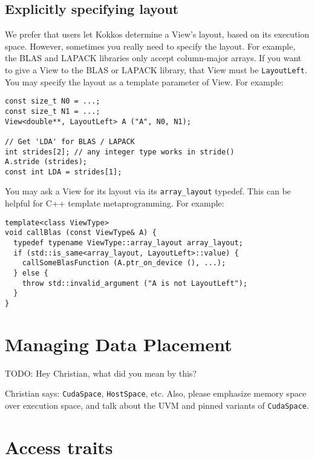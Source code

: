 \subsection{Explicitly specifying layout}\label{SS:View:Layout:Explicit}

We prefer that users let Kokkos determine a View's layout, based on
its execution space.  However, sometimes you really need to specify
the layout.  For example, the BLAS and LAPACK libraries only accept
column-major arrays.  If you want to give a View to the BLAS or
LAPACK library, that View must be \lstinline!LayoutLeft!.  You may specify the
layout as a template parameter of View.  For example:
\begin{lstlisting}
const size_t N0 = ...;
const size_t N1 = ...;
View<double**, LayoutLeft> A ("A", N0, N1);

// Get 'LDA' for BLAS / LAPACK
int strides[2]; // any integer type works in stride()
A.stride (strides);
const int LDA = strides[1];
\end{lstlisting}
You may ask a View for its layout via its \lstinline!array_layout! typedef.
This can be helpful for C++ template metaprogramming.  For example:
\begin{lstlisting}
template<class ViewType>
void callBlas (const ViewType& A) {
  typedef typename ViewType::array_layout array_layout;
  if (std::is_same<array_layout, LayoutLeft>::value) {
    callSomeBlasFunction (A.ptr_on_device (), ...);
  } else {
    throw std::invalid_argument ("A is not LayoutLeft");
  }
}
\end{lstlisting}

\section{Managing Data Placement}\label{S:View:Placement}

TODO: Hey Christian, what did you mean by this?

Christian says: \lstinline!CudaSpace!, \lstinline!HostSpace!, etc.
Also, please emphasize memory space over execution space, and talk
about the UVM and pinned variants of \lstinline!CudaSpace!.

\section{Access traits}\label{S:View:AccessTraits}

